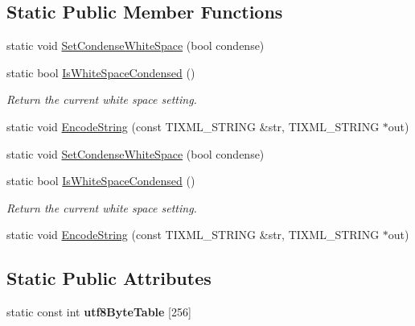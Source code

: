 \subsection*{Static Public Member Functions}
\begin{DoxyCompactItemize}
\item 
static void \hyperlink{class_ti_xml_base_a0f799ec645bfb8d8a969e83478f379c1}{Set\+Condense\+White\+Space} (bool condense)
\item 
\hypertarget{class_ti_xml_base_ad4b1472531c647a25b1840a87ae42438}{static bool \hyperlink{class_ti_xml_base_ad4b1472531c647a25b1840a87ae42438}{Is\+White\+Space\+Condensed} ()}\label{class_ti_xml_base_ad4b1472531c647a25b1840a87ae42438}

\begin{DoxyCompactList}\small\item\em Return the current white space setting. \end{DoxyCompactList}\item 
static void \hyperlink{class_ti_xml_base_a32ed202562b58de64c7d799ca3c9db98}{Encode\+String} (const T\+I\+X\+M\+L\+\_\+\+S\+T\+R\+I\+N\+G \&str, T\+I\+X\+M\+L\+\_\+\+S\+T\+R\+I\+N\+G $\ast$out)
\item 
static void \hyperlink{class_ti_xml_base_a0f799ec645bfb8d8a969e83478f379c1}{Set\+Condense\+White\+Space} (bool condense)
\item 
\hypertarget{class_ti_xml_base_ad4b1472531c647a25b1840a87ae42438}{static bool \hyperlink{class_ti_xml_base_ad4b1472531c647a25b1840a87ae42438}{Is\+White\+Space\+Condensed} ()}\label{class_ti_xml_base_ad4b1472531c647a25b1840a87ae42438}

\begin{DoxyCompactList}\small\item\em Return the current white space setting. \end{DoxyCompactList}\item 
static void \hyperlink{class_ti_xml_base_a6bd8c315c1acb09e34107b8736505948}{Encode\+String} (const T\+I\+X\+M\+L\+\_\+\+S\+T\+R\+I\+N\+G \&str, T\+I\+X\+M\+L\+\_\+\+S\+T\+R\+I\+N\+G $\ast$out)
\end{DoxyCompactItemize}
\subsection*{Static Public Attributes}
\begin{DoxyCompactItemize}
\item 
static const int {\bfseries utf8\+Byte\+Table} \mbox{[}256\mbox{]}
\end{DoxyCompactItemize}
